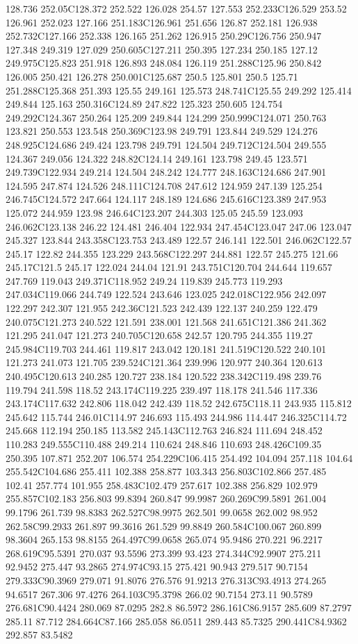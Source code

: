 128.736 252.05C128.372 252.522 126.028 254.57 127.553 252.233C126.529 253.52 126.961 252.023 127.166 251.183C126.961 251.656 126.87 252.181 126.938 252.732C127.166 252.338 126.165 251.262 126.915 250.29C126.756 250.947 127.348 249.319 127.029 250.605C127.211 250.395 127.234 250.185 127.12 249.975C125.823 251.918 126.893 248.084 126.119 251.288C125.96 250.842 126.005 250.421 126.278 250.001C125.687 250.5 125.801 250.5 125.71 251.288C125.368 251.393 125.55 249.161 125.573 248.741C125.55 249.292 125.414 249.844 125.163 250.316C124.89 247.822 125.323 250.605 124.754 249.292C124.367 250.264 125.209 249.844 124.299 250.999C124.071 250.763 123.821 250.553 123.548 250.369C123.98 249.791 123.844 249.529 124.276 248.925C124.686 249.424 123.798 249.791 124.504 249.712C124.504 249.555 124.367 249.056 124.322 248.82C124.14 249.161 123.798 249.45 123.571 249.739C122.934 249.214 124.504 248.242 124.777 248.163C124.686 247.901 124.595 247.874 124.526 248.111C124.708 247.612 124.959 247.139 125.254 246.745C124.572 247.664 124.117 248.189 124.686 245.616C123.389 247.953 125.072 244.959 123.98 246.64C123.207 244.303 125.05 245.59 123.093 246.062C123.138 246.22 124.481 246.404 122.934 247.454C123.047 247.06 123.047 245.327 123.844 243.358C123.753 243.489 122.57 246.141 122.501 246.062C122.57 245.17 122.82 244.355 123.229 243.568C122.297 244.881 122.57 245.275 121.66 245.17C121.5 245.17 122.024 244.04 121.91 243.751C120.704 244.644 119.657 247.769 119.043 249.371C118.952 249.24 119.839 245.773 119.293 247.034C119.066 244.749 122.524 243.646 123.025 242.018C122.956 242.097 122.297 242.307 121.955 242.36C121.523 242.439 122.137 240.259 122.479 240.075C121.273 240.522 121.591 238.001 121.568 241.651C121.386 241.362 121.295 241.047 121.273 240.705C120.658 242.57 120.795 244.355 119.27 245.984C119.703 244.461 119.817 243.042 120.181 241.519C120.522 240.101 121.273 241.073 121.705 239.524C121.364 239.996 120.977 240.364 120.613 240.495C120.613 240.285 120.727 238.184 120.522 238.342C119.498 239.76 119.794 241.598 118.52 243.174C119.225 239.497 118.178 241.546 117.336 243.174C117.632 242.806 118.042 242.439 118.52 242.675C118.11 243.935 115.812 245.642 115.744 246.01C114.97 246.693 115.493 244.986 114.447 246.325C114.72 245.668 112.194 250.185 113.582 245.143C112.763 246.824 111.694 248.452 110.283 249.555C110.488 249.214 110.624 248.846 110.693 248.426C109.35 250.395 107.871 252.207 106.574 254.229C106.415 254.492 104.094 257.118 104.64 255.542C104.686 255.411 102.388 258.877 103.343 256.803C102.866 257.485 102.41 257.774 101.955 258.483C102.479 257.617 102.388 256.829 102.979 255.857C102.183 256.803 99.8394 260.847 99.9987 260.269C99.5891 261.004 99.1796 261.739 98.8383 262.527C98.9975 262.501 99.0658 262.002 98.952 262.58C99.2933 261.897 99.3616 261.529 99.8849 260.584C100.067 260.899 98.3604 265.153 98.8155 264.497C99.0658 265.074 95.9486 270.221 96.2217 268.619C95.5391 270.037 93.5596 273.399 93.423 274.344C92.9907 275.211 92.9452 275.447 93.2865 274.974C93.15 275.421 90.943 279.517 90.7154 279.333C90.3969 279.071 91.8076 276.576 91.9213 276.313C93.4913 274.265 94.6517 267.306 97.4276 264.103C95.3798 266.02 90.7154 273.11 90.5789 276.681C90.4424 280.069 87.0295 282.8 86.5972 286.161C86.9157 285.609 87.2797 285.11 87.712 284.664C87.166 285.058 86.0511 289.443 85.7325 290.441C84.9362 292.857 83.5482 